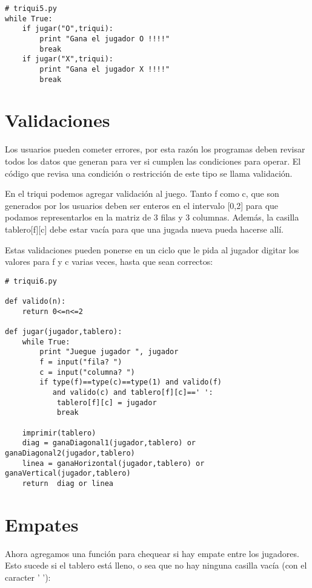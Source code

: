 \beforeverb
\begin{verbatim}
# triqui5.py
while True:
    if jugar("O",triqui):
        print "Gana el jugador O !!!!"
        break
    if jugar("X",triqui):
        print "Gana el jugador X !!!!"
        break
\end{verbatim}
\afterverb

\section{Validaciones}

Los usuarios pueden cometer errores, por esta razón los programas deben revisar
todos los datos que generan para ver si cumplen las condiciones
para operar. El código que revisa una condición 
o restricción de este tipo se llama validación.

En el triqui podemos agregar validación al juego. Tanto f como  c, que son 
generados por los usuarios deben ser enteros en el intervalo [0,2] para 
que podamos representarlos en la matriz de 3 filas y 3 columnas. Además,
la casilla tablero[f][c] debe estar vacía para que
una jugada nueva pueda hacerse allí.  

Estas validaciones pueden ponerse en un ciclo que le pida al jugador
digitar los valores para f y c varias veces, hasta que sean correctos:

\beforeverb
\begin{verbatim}
# triqui6.py

def valido(n):
    return 0<=n<=2
    
def jugar(jugador,tablero):
    while True:     
        print "Juegue jugador ", jugador
        f = input("fila? ")
        c = input("columna? ")
        if type(f)==type(c)==type(1) and valido(f) 
           and valido(c) and tablero[f][c]==' ':
            tablero[f][c] = jugador
            break      

    imprimir(tablero)
    diag = ganaDiagonal1(jugador,tablero) or ganaDiagonal2(jugador,tablero)
    linea = ganaHorizontal(jugador,tablero) or ganaVertical(jugador,tablero)
    return  diag or linea

\end{verbatim}
\afterverb

\section{Empates}

Ahora agregamos una función para chequear si hay empate entre los jugadores.
Esto sucede si el tablero está lleno, o sea que no hay ninguna casilla vacía 
(con el caracter ' '):

